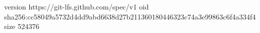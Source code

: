 version https://git-lfs.github.com/spec/v1
oid sha256:cc58049a5732d4dd9abd6638d27b211360180446323c74a3e99863c6f4a334f4
size 524376

